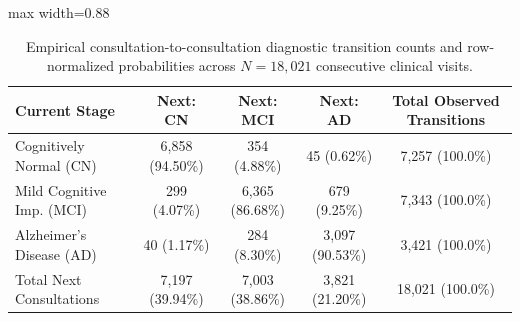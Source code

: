 \begin{table}[t]
\centering
\caption{Empirical consultation-to-consultation diagnostic transition counts and row-normalized probabilities across $N = 18,021$ consecutive clinical visits.}
\label{tab:diagnosis_transitions}
\small
\begin{adjustbox}{max width=0.88\linewidth}
\begin{tabular}{lcccc}
\toprule
\textbf{Current Stage} & \textbf{Next: CN} & \textbf{Next: MCI} & \textbf{Next: AD} & \textbf{Total Observed Transitions} \\
\midrule
Cognitively Normal (CN)  & 6,858 (94.50\%)   & 354 (4.88\%)       & 45 (0.62\%)       & 7,257 (100.0\%) \\
Mild Cognitive Imp. (MCI)& 299 (4.07\%)      & 6,365 (86.68\%)    & 679 (9.25\%)      & 7,343 (100.0\%) \\
Alzheimer's Disease (AD) & 40 (1.17\%)       & 284 (8.30\%)       & 3,097 (90.53\%)   & 3,421 (100.0\%) \\
\midrule
Total Next Consultations & 7,197 (39.94\%)   & 7,003 (38.86\%)    & 3,821 (21.20\%)   & 18,021 (100.0\%) \\
\bottomrule
\end{tabular}
\end{adjustbox}
\end{table}
